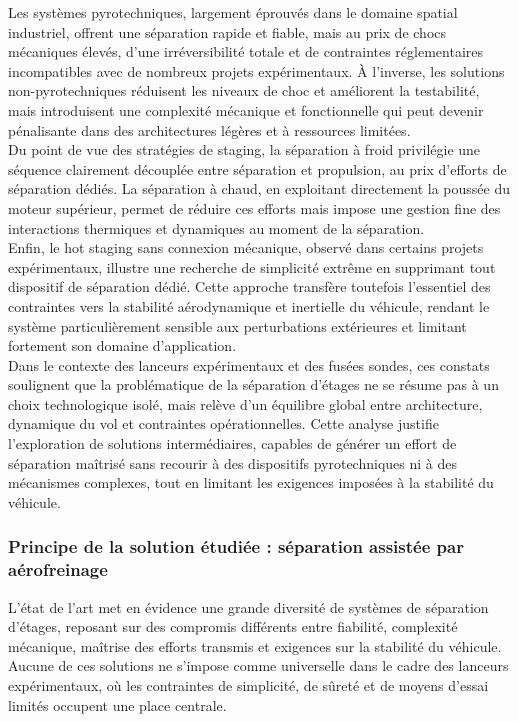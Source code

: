 Les systèmes pyrotechniques, largement éprouvés dans le domaine spatial industriel, offrent une séparation rapide et fiable, mais
au prix de chocs mécaniques élevés, d’une irréversibilité totale et de contraintes réglementaires incompatibles avec de nombreux
projets expérimentaux. À l’inverse, les solutions non-pyrotechniques réduisent les niveaux de choc et améliorent la testabilité,
mais introduisent une complexité mécanique et fonctionnelle qui peut devenir pénalisante dans des architectures légères et à
ressources limitées.\\

Du point de vue des stratégies de staging, la séparation à froid privilégie une séquence clairement découplée entre séparation et
propulsion, au prix d’efforts de séparation dédiés. La séparation à chaud, en exploitant directement la poussée du moteur
supérieur, permet de réduire ces efforts mais impose une gestion fine des interactions thermiques et dynamiques au moment de la
séparation.\\

Enfin, le hot staging sans connexion mécanique, observé dans certains projets expérimentaux, illustre une recherche de simplicité
extrême en supprimant tout dispositif de séparation dédié. Cette approche transfère toutefois l’essentiel des contraintes vers la
stabilité aérodynamique et inertielle du véhicule, rendant le système particulièrement sensible aux perturbations extérieures et
limitant fortement son domaine d’application.\\

Dans le contexte des lanceurs expérimentaux et des fusées sondes, ces constats soulignent que la problématique de la séparation
d’étages ne se résume pas à un choix technologique isolé, mais relève d’un équilibre global entre architecture, dynamique du vol
et contraintes opérationnelles. Cette analyse justifie l’exploration de solutions intermédiaires, capables de générer un effort
de séparation maîtrisé sans recourir à des dispositifs pyrotechniques ni à des mécanismes complexes, tout en limitant les
exigences imposées à la stabilité du véhicule.


\subsubsection{Principe de la solution étudiée : séparation assistée par aérofreinage}

L’état de l’art met en évidence une grande diversité de systèmes de séparation d’étages, reposant sur des compromis différents
entre fiabilité, complexité mécanique, maîtrise des efforts transmis et exigences sur la stabilité du véhicule. Aucune de ces
solutions ne s’impose comme universelle dans le cadre des lanceurs expérimentaux, où les contraintes de simplicité, de sûreté et
de moyens d’essai limités occupent une place centrale.\\

